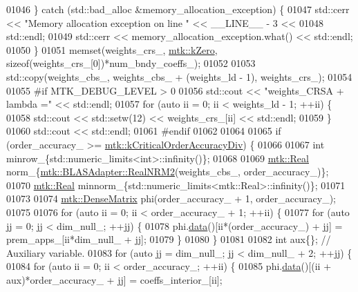 \begin{DoxyCode}
{{01046   \} \textcolor{keywordflow}{catch} (std::bad\_alloc &memory\_allocation\_exception) \{
01047     std::cerr << \textcolor{stringliteral}{"Memory allocation exception on line "} << \_\_LINE\_\_ - 3 <<
01048       std::endl;
01049     std::cerr << memory\_allocation\_exception.what() << std::endl;
01050   \}
01051   memset(weights\_crs\_, \hyperlink{group__c01-roots_ga59a451a5fae30d59649bcda274fea271}{mtk::kZero}, \textcolor{keyword}{sizeof}(weights\_crs\_[0])*num\_bndy\_coeffs\_);
01052 
01053   std::copy(weights\_cbs\_, weights\_cbs\_ + (weights\_ld - 1), weights\_crs\_);
01054 
01055 \textcolor{preprocessor}{  #if MTK\_DEBUG\_LEVEL > 0}
01056   std::cout << \textcolor{stringliteral}{"weights\_CRSA + lambda ="} << std::endl;
01057   \textcolor{keywordflow}{for} (\textcolor{keyword}{auto} ii = 0; ii < weights\_ld - 1; ++ii) \{
01058     std::cout << std::setw(12) << weights\_crs\_[ii] << std::endl;
01059   \}
01060   std::cout << std::endl;
01061 \textcolor{preprocessor}{  #endif}
01062 
01064 
01065   \textcolor{keywordflow}{if} (order\_accuracy\_ >= \hyperlink{group__c01-roots_ga0898eef2108473e44a5223932d571c31}{mtk::kCriticalOrderAccuracyDiv}) \{
01066 
01067     \textcolor{keywordtype}{int} minrow\_\{std::numeric\_limits<int>::infinity()\};
01068 
01069     \hyperlink{group__c01-roots_gac080bbbf5cbb5502c9f00405f894857d}{mtk::Real} norm\_\{\hyperlink{classmtk_1_1BLASAdapter_ab92440888b730863244c5d9479c11aca}{mtk::BLASAdapter::RealNRM2}(weights\_cbs\_,
      order\_accuracy\_)\};
01070     \hyperlink{group__c01-roots_gac080bbbf5cbb5502c9f00405f894857d}{mtk::Real} minnorm\_\{std::numeric\_limits<mtk::Real>::infinity()\};
01071 
01073 
01074     \hyperlink{classmtk_1_1DenseMatrix}{mtk::DenseMatrix} phi(order\_accuracy\_ + 1, order\_accuracy\_);
01075 
01076     \textcolor{keywordflow}{for} (\textcolor{keyword}{auto} ii = 0; ii < order\_accuracy\_ + 1; ++ii) \{
01077       \textcolor{keywordflow}{for} (\textcolor{keyword}{auto} jj = 0; jj < dim\_null\_; ++jj) \{
01078         phi.\hyperlink{classmtk_1_1DenseMatrix_a0c33b8a9e01d157c61ddbdf807c25d84}{data}()[ii*(order\_accuracy\_) + jj] = prem\_apps\_[ii*dim\_null\_ + jj];
01079       \}
01080     \}
01081 
01082     \textcolor{keywordtype}{int} aux\{\};  \textcolor{comment}{// Auxiliary variable.}
01083     \textcolor{keywordflow}{for} (\textcolor{keyword}{auto} jj = dim\_null\_; jj < dim\_null\_ + 2; ++jj) \{
01084       \textcolor{keywordflow}{for} (\textcolor{keyword}{auto} ii = 0; ii < order\_accuracy\_; ++ii) \{
01085         phi.\hyperlink{classmtk_1_1DenseMatrix_a0c33b8a9e01d157c61ddbdf807c25d84}{data}()[(ii + aux)*order\_accuracy\_ + jj] = coeffs\_interior\_[ii];
}}
\end{DoxyCode}
